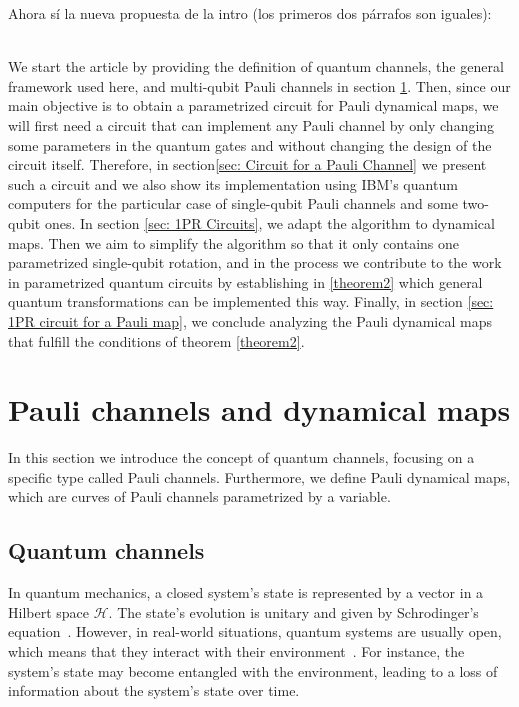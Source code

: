 \documentclass[10pt,letterpaper]{article} %
\begin{document}
Ahora sí la nueva propuesta de la intro (los primeros dos párrafos son iguales): \\
$\;$ \\
{\color{green}


We start the article by providing the definition of quantum channels, the general framework
used here, and multi-qubit Pauli channels in section \ref{sec: Pauli Channels}.
Then, since our main objective is to obtain a parametrized circuit for Pauli dynamical maps, we will first need a 
circuit that can implement any Pauli channel by only changing some parameters
in the quantum gates and without changing the design of the circuit itself.
Therefore, in section\ref{sec: Circuit
for a Pauli Channel} we present such a circuit
and we also show its implementation using IBM's quantum computers for the particular case of single-qubit Pauli channels and some two-qubit ones.
In section \ref{sec: 1PR Circuits}, we adapt the algorithm to dynamical maps.
Then we aim to simplify the algorithm so that it only contains one parametrized single-qubit rotation, 
and in the process we contribute to the work in parametrized quantum circuits by establishing   in
\ref{theorem2} which general quantum transformations
can be implemented this way.
Finally, in
section \ref{sec: 1PR circuit for a Pauli map}, we conclude analyzing the Pauli
dynamical maps that fulfill the conditions of theorem \ref{theorem2}. 
}
 




\section{Pauli channels and dynamical maps}  \label{sec: Pauli Channels} %


In this section  we introduce the concept of quantum channels, focusing on a
specific type called Pauli channels.  Furthermore, we define Pauli dynamical
maps, which are curves of Pauli channels parametrized by a variable.
\subsection{Quantum channels} \label{subsec: Quantum Channels} %


In quantum mechanics, a closed system's state is represented by a vector in a
Hilbert space $\mathcal{H}$.  The state's evolution is unitary and given by
Schrodinger's equation~\cite{Rieffel}.  However, in real-world situations,
quantum systems are usually open, which means that they interact with their
environment~\cite{breuer2007theory}.  For instance, the system's state may become
entangled with the environment, leading to a loss of information about the
system's state over time.
\end{document}
